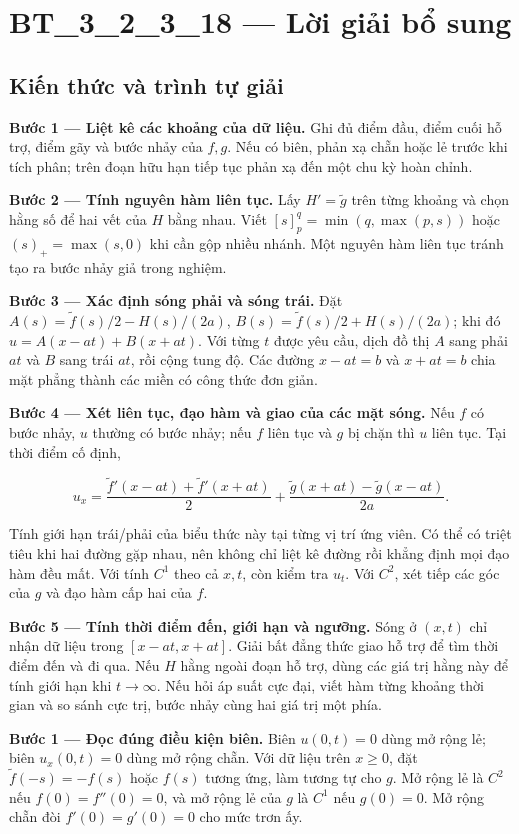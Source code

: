 \documentclass[10pt,a4paper]{article}
\begin{document}
\section*{BT\_3\_2\_3\_18 — Lời giải bổ sung}
\subsection*{Kiến thức và trình tự giải}
\textbf{Bước 1 — Liệt kê các khoảng của dữ liệu.} Ghi đủ điểm đầu, điểm cuối hỗ trợ, điểm gãy và bước nhảy của $f,g$. Nếu có biên, phản xạ chẵn hoặc lẻ trước khi tích phân; trên đoạn hữu hạn tiếp tục phản xạ đến một chu kỳ hoàn chỉnh.

\textbf{Bước 2 — Tính nguyên hàm liên tục.} Lấy $H'=\widetilde g$ trên từng khoảng và chọn hằng số để hai vết của $H$ bằng nhau. Viết $[s]_p^q=\min(q,\max(p,s))$ hoặc $(s)_+=\max(s,0)$ khi cần gộp nhiều nhánh. Một nguyên hàm liên tục tránh tạo ra bước nhảy giả trong nghiệm.

\textbf{Bước 3 — Xác định sóng phải và sóng trái.} Đặt $A(s)=\widetilde f(s)/2-H(s)/(2a)$, $B(s)=\widetilde f(s)/2+H(s)/(2a)$; khi đó $u=A(x-at)+B(x+at)$. Với từng $t$ được yêu cầu, dịch đồ thị $A$ sang phải $at$ và $B$ sang trái $at$, rồi cộng tung độ. Các đường $x-at=b$ và $x+at=b$ chia mặt phẳng thành các miền có công thức đơn giản.

\textbf{Bước 4 — Xét liên tục, đạo hàm và giao của các mặt sóng.} Nếu $f$ có bước nhảy, $u$ thường có bước nhảy; nếu $f$ liên tục và $g$ bị chặn thì $u$ liên tục. Tại thời điểm cố định,


\[
u_x=\frac{\widetilde f'(x-at)+\widetilde f'(x+at)}2+\frac{\widetilde g(x+at)-\widetilde g(x-at)}{2a}.
\]


Tính giới hạn trái/phải của biểu thức này tại từng vị trí ứng viên. Có thể có triệt tiêu khi hai đường gặp nhau, nên không chỉ liệt kê đường rồi khẳng định mọi đạo hàm đều mất. Với tính $C^1$ theo cả $x,t$, còn kiểm tra $u_t$. Với $C^2$, xét tiếp các góc của $g$ và đạo hàm cấp hai của $f$.

\textbf{Bước 5 — Tính thời điểm đến, giới hạn và ngưỡng.} Sóng ở $(x,t)$ chỉ nhận dữ liệu trong $[x-at,x+at]$. Giải bất đẳng thức giao hỗ trợ để tìm thời điểm đến và đi qua. Nếu $H$ hằng ngoài đoạn hỗ trợ, dùng các giá trị hằng này để tính giới hạn khi $t\to\infty$. Nếu hỏi áp suất cực đại, viết hàm từng khoảng thời gian và so sánh cực trị, bước nhảy cùng hai giá trị một phía.

\textbf{Bước 1 — Đọc đúng điều kiện biên.} Biên $u(0,t)=0$ dùng mở rộng lẻ; biên $u_x(0,t)=0$ dùng mở rộng chẵn. Với dữ liệu trên $x\ge0$, đặt $\widetilde f(-s)=-f(s)$ hoặc $f(s)$ tương ứng, làm tương tự cho $g$. Mở rộng lẻ là $C^2$ nếu $f(0)=f''(0)=0$, và mở rộng lẻ của $g$ là $C^1$ nếu $g(0)=0$. Mở rộng chẵn đòi $f'(0)=g'(0)=0$ cho mức trơn ấy.
\end{document}
